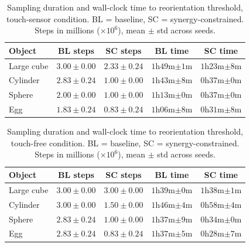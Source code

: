 \documentclass[letterpaper, 10 pt, conference]{ieeeconf}  %
\begin{document}
\begin{table}[t]
    \caption{Sampling duration and wall-clock time to reorientation
    threshold, touch-sensor condition. BL = baseline, SC =
    synergy-constrained. Steps in millions ($\times10^6$), mean $\pm$
    std across seeds.}
    \label{tab:sensor}
    \begin{center}
    \footnotesize
    \begin{tabular}{lcccc}
    \hline
    \textbf{Object} & \textbf{BL steps} & \textbf{SC steps} & \textbf{BL time} & \textbf{SC time} \\
    \hline
    Large cube & $3.00\pm0.00$ & $2.33\pm0.24$ & $1$h$49$m$\pm1$m & $1$h$23$m$\pm8$m \\
    Cylinder   & $2.83\pm0.24$ & $1.00\pm0.00$ & $1$h$43$m$\pm8$m & $0$h$37$m$\pm0$m \\
    Sphere     & $2.00\pm0.00$         & $1.00\pm0.00$ & $1$h$13$m$\pm0$m          & $0$h$37$m$\pm0$m \\
    Egg        & $1.83\pm0.24$         & $0.83\pm0.24$ & $1$h$06$m$\pm8$m          & $0$h$31$m$\pm8$m \\
    \hline
    \end{tabular}
    \end{center}
\end{table}



\begin{table}[t]
    \caption{Sampling duration and wall-clock time to reorientation
    threshold, touch-free condition. BL = baseline, SC =
    synergy-constrained. Steps in millions ($\times10^6$), mean $\pm$
    std across seeds.}
    \label{tab:nosensor}
    \begin{center}
    \footnotesize
    \begin{tabular}{lcccc}
    \hline
    \textbf{Object} & \textbf{BL steps} & \textbf{SC steps} & \textbf{BL time} & \textbf{SC time} \\
    \hline
    Large cube & $3.00\pm0.00$ & $3.00\pm0.00$ & $1$h$39$m$\pm0$m & $1$h$38$m$\pm1$m \\
    Cylinder   & $3.00\pm0.00$ & $1.50\pm0.00$ & $1$h$46$m$\pm4$m & $0$h$58$m$\pm4$m \\
    Sphere     & $2.83\pm0.24$         & $1.00\pm0.00$ & $1$h$37$m$\pm9$m          & $0$h$34$m$\pm0$m \\
    Egg        & $2.83\pm0.24$         & $0.83\pm0.24$ & $1$h$37$m$\pm5$m          & $0$h$28$m$\pm7$m \\
    \hline
    \end{tabular}
    \end{center}
\end{table}
\end{document}
